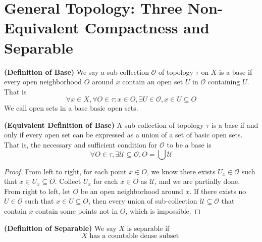 \documentclass{report}
\begin{document}
\section{General Topology: Three Non-Equivalent Compactness and Separable}
\begin{definition}
\label{2.6.1}
\textbf{(Definition of Base)} We say a sub-collection $\mathcal{O}$ of topology $\tau$ on $X$ is a base if every open neighborhood $O$ around $x$ contain an open set $U$ in $\mathcal{O}$ containing $U$. That is
\begin{equation}
\forall x\in X, \forall O\in\tau:x\in O,\exists U\in \mathcal{O}, x\in U\subseteq O
\end{equation}
We call open sets in a base basic open sets.
\end{definition}
\begin{theorem}
\label{2.6.2}
\textbf{(Equivalent Definition of Base)} A sub-collection of topology $\tau$ is a base if and only if every open set can be expressed as a union of a set of basic open sets. That is, the necessary and sufficient condition for $\mathcal{O}$ to be a base is 
\begin{equation}
\forall O\in \tau, \exists \mathcal{U}\subseteq \mathcal{O}, O=\bigcup \mathcal{U}
\end{equation}
\end{theorem}
\begin{proof}
  From left to right, for each point $x\in O$, we know there exists $U_x\in \mathcal{O}$ such that $x\in U_x\subseteq O$. Collect $U_x$ for each $x\in O$ as $\mathcal{U}$, and we are partially done.\\

  From right to left, let $O$ be an open neighborhood around $x$. If there exists no $U\in \mathcal{O}$ such that $x\in U\subseteq O$, then every union of sub-collection $\mathcal{U}\subseteq\mathcal{O}$ that contain $x$ contain some points not in  $O$, which is impossible.  
\end{proof}
\begin{definition}
\label{2.6.3}
\textbf{(Definition of Separable)} We say $X$ is separable if 
\begin{equation}
  X\text{ has a countable dense subset }
\end{equation}
\end{definition}
\end{document}
